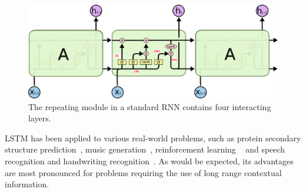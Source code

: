 \begin{figure}[h]
\centering
\includegraphics[scale=0.4]{figures/LSTM3-chain_1.png}
\caption{The repeating module in a standard \textsc{RNN} contains four interacting layers.~\cite{colahSite}}
\label{fig:lstmRNN}
\end{figure}

\textsc{LSTM} has been applied to various real-world problems, such as protein secondary structure prediction~\cite{Hochreiter07}, music generation~\cite{Music02}, reinforcement learning ~\cite{Bakker02} and speech recognition and handwriting recognition~\cite{GravesLFBBS09}. As would be expected, its advantages are most pronounced for problems requiring the use of long range contextual information.